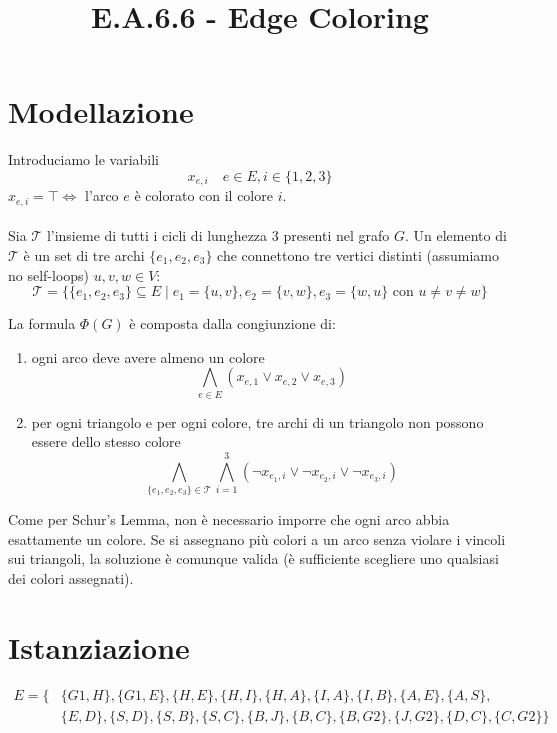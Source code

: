 \documentclass[10pt]{article}
\title{E.A.6.6 - Edge Coloring}
\author{}
\date{}
\begin{document}
\maketitle
\vspace{-6em}

\section{Modellazione}

Introduciamo le variabili
\[
x_{e,i}  \quad e \in E, i \in \{1, 2, 3\}
\]
$x_{e,i} = \top \iff $ l'arco $e$ è colorato con il colore $i$.

\paragraph{}

Sia $\mathcal{T}$ l'insieme di tutti i cicli di lunghezza 3 presenti nel grafo $G$. Un elemento di $\mathcal{T}$ è un set di tre archi $\{e_1, e_2, e_3\}$ che connettono tre vertici distinti (assumiamo no self-loops) $u, v, w \in V$:
\[
\mathcal{T} = \{ \{e_1, e_2, e_3\} \subseteq E \mid e_1=\{u,v\}, e_2=\{v,w\}, e_3=\{w,u\} \text{ con } u \neq v \neq w \}
\]

La formula $\Phi(G)$ è composta dalla congiunzione di:

\begin{enumerate}
    \item ogni arco deve avere almeno un colore
    \[
    \bigwedge_{e \in E} (x_{e,1} \lor x_{e,2} \lor x_{e,3})
    \]
    
    \item per ogni triangolo e per ogni colore, tre archi di un triangolo non possono essere dello stesso colore
    \[
    \bigwedge_{\{e_1, e_2, e_3\} \in \mathcal{T}} \bigwedge_{i=1}^{3} (\neg x_{e_1,i} \lor \neg x_{e_2,i} \lor \neg x_{e_3,i})
    \]
\end{enumerate}

Come per Schur's Lemma, non è necessario imporre che ogni arco abbia esattamente un colore. Se si assegnano più colori a un arco senza violare i vincoli sui triangoli, la soluzione è comunque valida (è sufficiente scegliere uno qualsiasi dei colori assegnati).

\section{Istanziazione}

\[
\begin{aligned}
E = \{ & \{G1, H\}, \{G1, E\}, \{H, E\}, \{H, I\}, \{H, A\}, \{I, A\}, \{I, B\}, \{A, E\}, \{A, S\}, \\
& \{E, D\}, \{S, D\}, \{S, B\}, \{S, C\}, \{B, J\}, \{B, C\}, \{B, G2\}, \{J, G2\}, \{D, C\}, \{C, G2\} \}
\end{aligned}
\]
\end{document}
